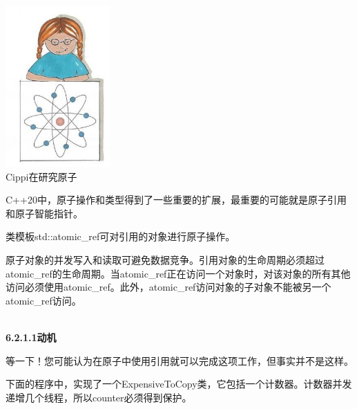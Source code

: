 \begin{center}
\includegraphics[width=0.3\textwidth]{content/3/chapter6/images/7.png}\\
Cippi在研究原子
\end{center}

C++20中，原子操作和类型得到了一些重要的扩展，最重要的可能就是原子引用和原子智能指针。


类模板std::atomic\_ref可对引用的对象进行原子操作。

原子对象的并发写入和读取可避免数据竞争。引用对象的生命周期必须超过atomic\_ref的生命周期。当atomic\_ref正在访问一个对象时，对该对象的所有其他访问必须使用atomic\_ref。此外，atomic\_ref访问对象的子对象不能被另一个atomic\_ref访问。

\hspace*{\fill} \\ %
\noindent
\textbf{6.2.1.1\hspace{0.2cm}动机}

等一下！您可能认为在原子中使用引用就可以完成这项工作，但事实并不是这样。

下面的程序中，实现了一个ExpensiveToCopy类，它包括一个计数器。计数器并发递增几个线程，所以counter必须得到保护。

